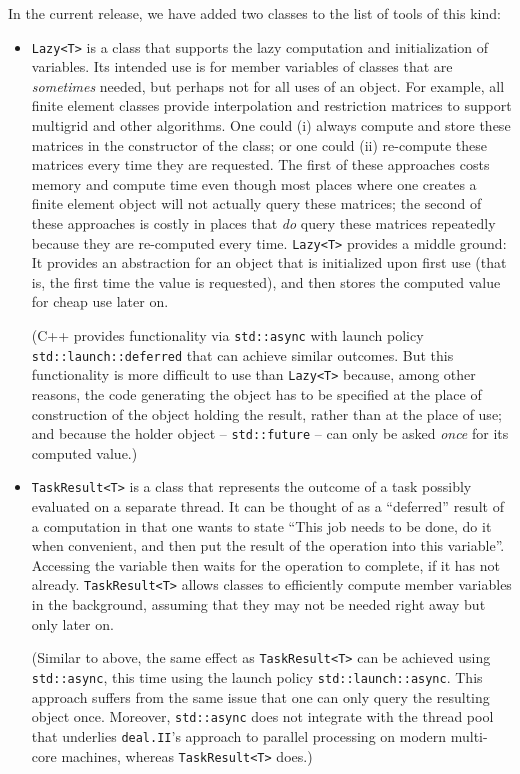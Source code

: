 \documentclass{ansarticle-preprint}
\newcommand{\specialword}[1]{\texttt{#1}}
\newcommand{\dealii}{{\specialword{deal.II}}\xspace}
\begin{document}
In the current release, we have added two classes to the list of tools
of this kind:
\begin{itemize}
  \item
  \texttt{Lazy<T>} is a class that supports the lazy computation and
  initialization of variables. Its intended use is for member
  variables of classes that are \textit{sometimes} needed, but perhaps
  not for all uses of an object. For example, all finite element classes
  provide interpolation and restriction matrices to support multigrid
  and other algorithms. One could (i) always compute and store these
  matrices in the constructor of the class; or one could (ii) re-compute these
  matrices every time they are requested. The first of these
  approaches costs memory and compute time even though most places
  where one creates a finite element object will not actually query
  these matrices; the second of these approaches is costly in places
  that \textit{do} query these matrices repeatedly because they are re-computed
  every time. \texttt{Lazy<T>} provides a middle ground: It provides an
  abstraction for an object that is initialized upon first use (that
  is, the first time the value is requested), and then stores the
  computed value for cheap use later on.

  (C++ provides functionality via \texttt{std::async} with
  launch policy \texttt{std::launch::deferred} that can achieve
  similar outcomes. But this functionality is more difficult to use than
  \texttt{Lazy<T>} because, among other reasons, the code generating the
  object has to be specified at the place of construction of the
  object holding the result, rather than at the place of use; and
  because the holder object -- \texttt{std::future} -- can only be
  asked \textit{once} for its computed value.)

  \item \texttt{TaskResult<T>} is a class that represents the outcome
    of a task possibly evaluated on a separate thread. It can be
    thought of as a ``deferred'' result of a computation in that one
    wants to state ``This job needs to be done, do it when convenient,
    and then put the result of the operation into this
    variable''. Accessing the variable then waits for the operation to
    complete, if it has not already. \texttt{TaskResult<T>} allows
    classes to efficiently compute member variables in the background,
    assuming that they may not be needed right away but only later on.

    (Similar to above, the same effect as \texttt{TaskResult<T>} can
    be achieved using \texttt{std::async}, this time using the
    launch policy \texttt{std::launch::async}. This approach suffers
    from the same issue that one can only query the resulting object
    once. Moreover, \texttt{std::async} does not integrate with the
    thread pool that underlies \dealii{}'s approach to parallel
    processing on modern multi-core machines, whereas
    \texttt{TaskResult<T>} does.)
\end{itemize}
\end{document}
